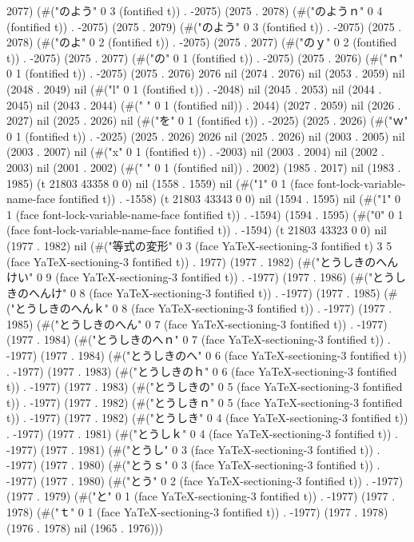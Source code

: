 2077) (#("のよう" 0 3 (fontified t)) . -2075) (2075 . 2078) (#("のようｎ" 0 4 (fontified t)) . -2075) (2075 . 2079) (#("のよう" 0 3 (fontified t)) . -2075) (2075 . 2078) (#("のよ" 0 2 (fontified t)) . -2075) (2075 . 2077) (#("のｙ" 0 2 (fontified t)) . -2075) (2075 . 2077) (#("の" 0 1 (fontified t)) . -2075) (2075 . 2076) (#("ｎ" 0 1 (fontified t)) . -2075) (2075 . 2076) 2076 nil (2074 . 2076) nil (2053 . 2059) nil (2048 . 2049) nil (#("l" 0 1 (fontified t)) . -2048) nil (2045 . 2053) nil (2044 . 2045) nil (2043 . 2044) (#(" " 0 1 (fontified nil)) . 2044) (2027 . 2059) nil (2026 . 2027) nil (2025 . 2026) nil (#("を" 0 1 (fontified t)) . -2025) (2025 . 2026) (#("ｗ" 0 1 (fontified t)) . -2025) (2025 . 2026) 2026 nil (2025 . 2026) nil (2003 . 2005) nil (2003 . 2007) nil (#("x" 0 1 (fontified t)) . -2003) nil (2003 . 2004) nil (2002 . 2003) nil (2001 . 2002) (#(" " 0 1 (fontified nil)) . 2002) (1985 . 2017) nil (1983 . 1985) (t 21803 43358 0 0) nil (1558 . 1559) nil (#("1" 0 1 (face font-lock-variable-name-face fontified t)) . -1558) (t 21803 43343 0 0) nil (1594 . 1595) nil (#("1" 0 1 (face font-lock-variable-name-face fontified t)) . -1594) (1594 . 1595) (#("0" 0 1 (face font-lock-variable-name-face fontified t)) . -1594) (t 21803 43323 0 0) nil (1977 . 1982) nil (#("等式の変形" 0 3 (face YaTeX-sectioning-3 fontified t) 3 5 (face YaTeX-sectioning-3 fontified t)) . 1977) (1977 . 1982) (#("とうしきのへんけい" 0 9 (face YaTeX-sectioning-3 fontified t)) . -1977) (1977 . 1986) (#("とうしきのへんけ" 0 8 (face YaTeX-sectioning-3 fontified t)) . -1977) (1977 . 1985) (#("とうしきのへんｋ" 0 8 (face YaTeX-sectioning-3 fontified t)) . -1977) (1977 . 1985) (#("とうしきのへん" 0 7 (face YaTeX-sectioning-3 fontified t)) . -1977) (1977 . 1984) (#("とうしきのへｎ" 0 7 (face YaTeX-sectioning-3 fontified t)) . -1977) (1977 . 1984) (#("とうしきのへ" 0 6 (face YaTeX-sectioning-3 fontified t)) . -1977) (1977 . 1983) (#("とうしきのｈ" 0 6 (face YaTeX-sectioning-3 fontified t)) . -1977) (1977 . 1983) (#("とうしきの" 0 5 (face YaTeX-sectioning-3 fontified t)) . -1977) (1977 . 1982) (#("とうしきｎ" 0 5 (face YaTeX-sectioning-3 fontified t)) . -1977) (1977 . 1982) (#("とうしき" 0 4 (face YaTeX-sectioning-3 fontified t)) . -1977) (1977 . 1981) (#("とうしｋ" 0 4 (face YaTeX-sectioning-3 fontified t)) . -1977) (1977 . 1981) (#("とうし" 0 3 (face YaTeX-sectioning-3 fontified t)) . -1977) (1977 . 1980) (#("とうｓ" 0 3 (face YaTeX-sectioning-3 fontified t)) . -1977) (1977 . 1980) (#("とう" 0 2 (face YaTeX-sectioning-3 fontified t)) . -1977) (1977 . 1979) (#("と" 0 1 (face YaTeX-sectioning-3 fontified t)) . -1977) (1977 . 1978) (#("ｔ" 0 1 (face YaTeX-sectioning-3 fontified t)) . -1977) (1977 . 1978) (1976 . 1978) nil (1965 . 1976)))
